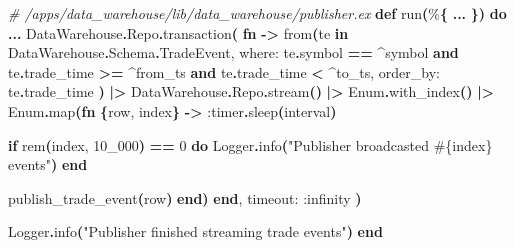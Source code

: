 \documentclass[
  oneside]{book}
\newenvironment{Shaded}{\begin{snugshade}}{\end{snugshade}}
\newcommand{\CommentTok}[1]{\textcolor[rgb]{0.56,0.35,0.01}{\textit{#1}}}
\newcommand{\ConstantTok}[1]{\textcolor[rgb]{0.56,0.35,0.01}{#1}}
\newcommand{\ControlFlowTok}[1]{\textcolor[rgb]{0.13,0.29,0.53}{\textbf{#1}}}
\newcommand{\DecValTok}[1]{\textcolor[rgb]{0.00,0.00,0.81}{#1}}
\newcommand{\FunctionTok}[1]{\textcolor[rgb]{0.13,0.29,0.53}{\textbf{#1}}}
\newcommand{\KeywordTok}[1]{\textcolor[rgb]{0.13,0.29,0.53}{\textbf{#1}}}
\newcommand{\NormalTok}[1]{#1}
\newcommand{\OperatorTok}[1]{\textcolor[rgb]{0.81,0.36,0.00}{\textbf{#1}}}
\newcommand{\OtherTok}[1]{\textcolor[rgb]{0.56,0.35,0.01}{#1}}
\newcommand{\StringTok}[1]{\textcolor[rgb]{0.31,0.60,0.02}{#1}}
\newcommand{\VariableTok}[1]{\textcolor[rgb]{0.00,0.00,0.00}{#1}}
\begin{document}
\begin{Shaded}
\begin{Highlighting}[]
  \CommentTok{\# /apps/data\_warehouse/lib/data\_warehouse/publisher.ex}
  \KeywordTok{def}\NormalTok{ run}\FunctionTok{(}\NormalTok{\%}\FunctionTok{\{}
        \OperatorTok{...}
      \FunctionTok{\})} \KeywordTok{do}
    \OperatorTok{...}
    \ConstantTok{DataWarehouse}\OperatorTok{.}\ConstantTok{Repo}\OperatorTok{.}\NormalTok{transaction}\FunctionTok{(}
      \KeywordTok{fn} \OperatorTok{{-}\textgreater{}}
\NormalTok{        from}\FunctionTok{(}\NormalTok{te }\KeywordTok{in} \ConstantTok{DataWarehouse}\OperatorTok{.}\ConstantTok{Schema}\OperatorTok{.}\ConstantTok{TradeEvent}\NormalTok{,}
          \VariableTok{where:}
\NormalTok{            te}\OperatorTok{.}\NormalTok{symbol }\OperatorTok{==} \OperatorTok{\^{}}\NormalTok{symbol }\KeywordTok{and}
\NormalTok{              te}\OperatorTok{.}\NormalTok{trade\_time }\OperatorTok{\textgreater{}=} \OperatorTok{\^{}}\NormalTok{from\_ts }\KeywordTok{and}
\NormalTok{              te}\OperatorTok{.}\NormalTok{trade\_time }\OperatorTok{\textless{}} \OperatorTok{\^{}}\NormalTok{to\_ts,}
          \VariableTok{order\_by:}\NormalTok{ te}\OperatorTok{.}\NormalTok{trade\_time}
        \FunctionTok{)}
        \OperatorTok{|\textgreater{}} \ConstantTok{DataWarehouse}\OperatorTok{.}\ConstantTok{Repo}\OperatorTok{.}\NormalTok{stream}\FunctionTok{()}
        \OperatorTok{|\textgreater{}} \ConstantTok{Enum}\OperatorTok{.}\NormalTok{with\_index}\FunctionTok{()}
        \OperatorTok{|\textgreater{}} \ConstantTok{Enum}\OperatorTok{.}\NormalTok{map}\FunctionTok{(}\KeywordTok{fn} \FunctionTok{\{}\NormalTok{row, index}\FunctionTok{\}} \OperatorTok{{-}\textgreater{}}
          \VariableTok{:timer}\OperatorTok{.}\NormalTok{sleep}\FunctionTok{(}\NormalTok{interval}\FunctionTok{)}

          \ControlFlowTok{if}\NormalTok{ rem}\FunctionTok{(}\NormalTok{index, }\DecValTok{10\_000}\FunctionTok{)} \OperatorTok{==} \DecValTok{0} \KeywordTok{do}
            \ConstantTok{Logger}\OperatorTok{.}\NormalTok{info}\FunctionTok{(}\StringTok{"Publisher broadcasted }\OtherTok{\#\{}\NormalTok{index}\OtherTok{\}}\StringTok{ events"}\FunctionTok{)}
          \KeywordTok{end}

\NormalTok{          publish\_trade\_event}\FunctionTok{(}\NormalTok{row}\FunctionTok{)}
        \KeywordTok{end}\FunctionTok{)}
      \KeywordTok{end}\NormalTok{,}
      \VariableTok{timeout:} \VariableTok{:infinity}
    \FunctionTok{)}

    \ConstantTok{Logger}\OperatorTok{.}\NormalTok{info}\FunctionTok{(}\StringTok{"Publisher finished streaming trade events"}\FunctionTok{)}
  \KeywordTok{end}
\end{Highlighting}
\end{Shaded}
\end{document}

